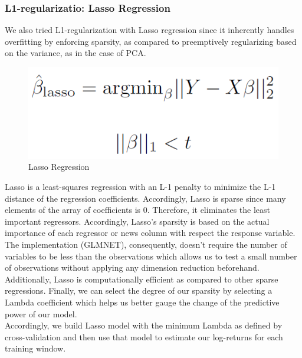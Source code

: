 \subsubsection{L1-regularizatio: Lasso Regression}
We also tried L1-regularization with Lasso regression since it inherently handles overfitting by enforcing sparsity, as compared to preemptively regularizing based on the variance, as in the case of PCA. \cite{glmnet}
\begin{figure}[ht]
	\vskip 0.2in
	\begin{center}
		\centerline{\includegraphics[scale=0.15]{Lasso.PNG}}
		\caption{Lasso Regression}
	\end{center}
	\vskip -0.2in
	\label{fig: Lasso}
\end{figure}
Lasso is a least-squares regression with an L-1 penalty to minimize the L-1 distance of the regression coefficients. Accordingly, Lasso is sparse since many elements of the array of coefficients is 0. Therefore, it eliminates the least important regressors. Accordingly, Lasso's sparsity is based on the actual importance of each regressor or news column with respect the response variable. The implementation (GLMNET), consequently, doesn't require the number of variables to be less than the observations which allows us to test a small number of observations without applying any dimension reduction beforehand. \cite{glmnet}\\
Additionally, Lasso is computationally efficient as compared to other sparse regressions.\cite{glmnet} Finally, we can select the degree of our sparsity by selecting a Lambda coefficient which helps us better gauge the change of the predictive power of our model. \\
Accordingly, we build Lasso model with the minimum Lambda as defined by cross-validation and then use that model to estimate our log-returns for each training window. \\
